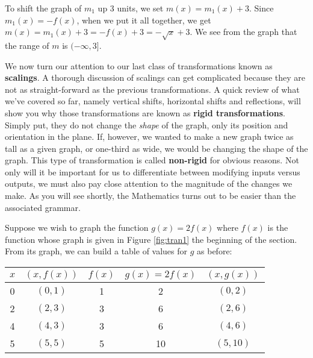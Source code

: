 {\begin{enumerate}

To shift the graph of $m_{1}$ up $3$ units, we set $m(x) = m_{1}(x)+3$.  Since $m_{1}(x) = -f(x)$, when we put it all together, we get $m(x) = m_{1}(x)+3 = -f(x) + 3 = -\sqrt{x}+3$.   We see from the graph that the range of $m$ is $(-\infty, 3]$.


\end{enumerate}
}

\medskip

We now turn our attention to our last class of transformations known as \textbf{scalings}.  A thorough discussion of scalings can get complicated because they are not as straight-forward as the previous transformations.  A quick review of what we've covered so far, namely vertical shifts, horizontal shifts and reflections, will show you why those transformations are known as \textbf{rigid transformations}.  Simply put, they do not change the \emph{shape} of the graph, only its position and orientation in the plane.  If, however, we wanted to make a new graph twice as tall as a given graph, or one-third as wide, we would be changing the shape of the graph. This type of transformation is called \textbf{non-rigid} for obvious reasons.  Not only will it be important for us to differentiate between modifying inputs versus outputs, we must also pay close attention to the magnitude of the changes we make.  As you will see shortly, the Mathematics turns out to be easier than the associated grammar.

\smallskip

Suppose we wish to graph the function $g(x) =2 f(x)$ where $f(x)$ is the function whose graph is given in Figure \ref{fig:tran1} the beginning of the section. From its graph, we can build a table of values for $g$ as before: 

\begin{center}
\begin{tabular}{|c||c|c|c|c|}  

\hline

 $x$ & $(x,f(x))$ & $f(x)$ & $g(x)=2f(x)$ & $(x, g(x))$ \\ \hline
0 & $(0,1)$ & 1 &  2 &$(0, 2)$ \\  \hline
2 & $(2,3)$ & 3 &  6 &$(2,6)$ \\  \hline
4 & $(4,3)$ & 3 &  6 &$(4, 6)$ \\  \hline
5 & $(5,5)$ & 5 &  10&$( 5 ,10)$ \\  \hline
\end{tabular}
\end{center}

